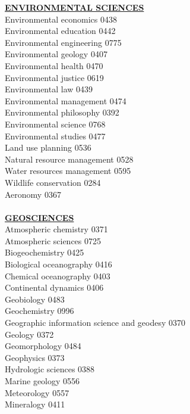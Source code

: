 \documentclass[9pt,twoside]{article}
\newcommand{\categoryheading}[1]{{\fontsize{8}{11}\selectfont \textbf{\uline{#1}}}}
\begin{document}
{\begin{multicols}{3}
\categoryheading{ENVIRONMENTAL SCIENCES} \\
Environmental economics \hfill 0438 \\
Environmental education \hfill 0442 \\
Environmental engineering \hfill 0775 \\
Environmental geology \hfill 0407 \\
Environmental health \hfill 0470 \\
Environmental justice \hfill 0619 \\
Environmental law \hfill 0439 \\
Environmental management \hfill 0474 \\
Environmental philosophy \hfill 0392 \\
Environmental science \hfill 0768 \\
Environmental studies \hfill 0477 \\
Land use planning \hfill 0536 \\
Natural resource management \hfill 0528 \\
Water resources management \hfill 0595 \\
Wildlife conservation \hfill 0284 \\
Aeronomy \hfill 0367 \\
\columnbreak \\
\categoryheading{GEOSCIENCES} \\
Atmospheric chemistry \hfill 0371 \\
Atmospheric sciences \hfill 0725 \\
Biogeochemistry \hfill 0425 \\
Biological oceanography \hfill 0416 \\
Chemical oceanography \hfill 0403 \\
Continental dynamics \hfill 0406 \\
Geobiology \hfill 0483 \\
Geochemistry \hfill 0996 \\
Geographic information science
and geodesy \hfill 0370 \\
Geology \hfill 0372 \\
Geomorphology \hfill 0484 \\
Geophysics \hfill 0373 \\
Hydrologic sciences \hfill 0388 \\
Marine geology \hfill 0556 \\
Meteorology \hfill 0557 \\
Mineralogy \hfill 0411 \\

\end{multicols}}
\end{document}
